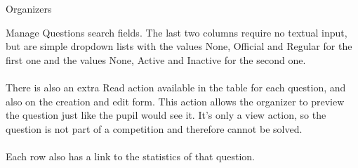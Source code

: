 \begin{section}{Organizers}
\begin{subsection}{Manage Questions}
		search fields. The last two columns require no textual input, but are simple dropdown
		lists with the values None, Official and Regular for the first one and the
		values None, Active and Inactive for the second one.\\
		\\
		There is also an extra Read action available in the table for each question, and
		also on the creation and edit form. This action allows the organizer to preview
		the question just like the pupil would see it. It's only a view action, so the
		question is not part of a competition and therefore cannot be solved. \\
		\\
		Each row also has a link to the statistics of that question.
	\end{subsection}
	

\end{section}
